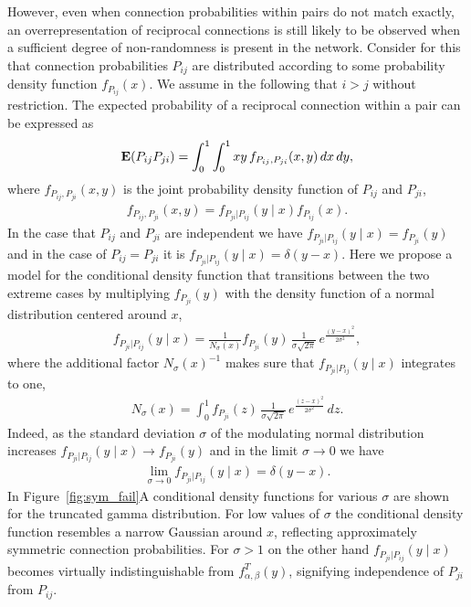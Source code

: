 However, even when connection probabilities within pairs do not match exactly, an overrepresentation of reciprocal connections is still likely to be observed when a sufficient degree of non-randomness is present in the network. Consider for this that connection probabilities $P_{ij}$ are distributed according to some probability density function $f_{P_{ij}}(x)$. We assume in the following that $i > j$ without restriction. The expected probability of a reciprocal connection within a pair can be expressed as
%
\begin{align}
  \operatorname{\mathbf{E}}(P_{ij}P_{ji}) = \int_0^1 \int_0^1 xy\, f_{P_{ij},P_{ji}}(x,y) \, dx\, dy, \label{eq:dbint}
\end{align}
%
where $f_{P_{ij},P_{ji}}(x,y)$ is the joint probability density function of $P_{ij}$ and $P_{ji}$, 
%
\begin{align}
  f_{P_{ij},P_{ji}}(x,y) =  f_{P_{ji} | P_{ij}}(y \mid x) f_{P_{ij}}(x). \label{eq:cdf_def}
\end{align}
%
In the case that $P_{ij}$ and $P_{ji}$ are independent we have $f_{P_{ji} | P_{ij}}(y \mid x) = f_{P_{ji}}(y)$ and in the case of $P_{ij}=P_{ji}$ it is $f_{P_{ji} | P_{ij}}(y \mid x) = \delta(y-x)$. Here we propose a model for the conditional density function that transitions between the two extreme cases by multiplying $f_{P_{ji}}(y)$ with the density function of a normal distribution centered around $x$,
%
\begin{align}
  f_{P_{ji} | P_{ij}} (y \mid x) = \frac{1}{N_{\sigma}(x)} f_{P_{ji}}(y)\, \frac{1}{\sigma \sqrt{2 \pi}} \,e^{\frac{(y-x)^2}{2 \sigma^2}} \label{eq:fpijpji},
\end{align}
%
where the additional factor $N_{\sigma}(x)^{-1}$  makes sure that $f_{P_{ji}|P_{ij}} (y \mid x)$ integrates to one,
%
\begin{align}
  N_{\sigma}(x) = \int_0^1 f_{P_{ji}}(z)\, \frac{1}{\sigma \sqrt{2 \pi}}\, e^{\frac{(z-x)^2}{2 \sigma^2}} \,dz.
\end{align}
%
Indeed, as the standard deviation $\sigma$ of the modulating normal distribution increases $f_{P_{ji}|P_{ij}} (y \mid x) \to f_{P_{ji}}(y)$ and in the limit $\sigma \to 0$ we have
\begin{align}
  \lim_{\sigma \to 0}   f_{P_{ji}|P_{ij}} (y \mid x) = \delta(y-x).
\end{align}
%
In Figure~\ref{fig:sym_fail}A  conditional density functions for various $\sigma$ are shown for the truncated gamma distribution. For low values of $\sigma$ the conditional density function resembles a narrow Gaussian around $x$, reflecting approximately symmetric connection probabilities. For $\sigma > 1$ on the other hand $f_{P_{ji} | P_{ij}}(y \mid x)$ becomes virtually indistinguishable from $f^T_{\alpha, \beta}(y)$, signifying independence of $P_{ji}$ from $P_{ij}$.

